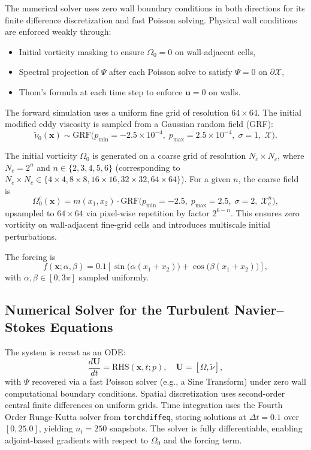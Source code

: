 The numerical solver uses zero wall boundary conditions in both directions for its finite difference discretization and fast Poisson solving. Physical wall conditions are enforced weakly through:
\begin{itemize}
    \item Initial vorticity masking to ensure \( \Omega_0 = 0 \) on wall-adjacent cells,
    \item Spectral projection of \( \Psi \) after each Poisson solve to satisfy \( \Psi = 0 \) on \( \partial \mathcal{X} \),
    \item Thom’s formula at each time step to enforce \( \mathbf{u} = 0 \) on walls.
\end{itemize}

The forward simulation uses a uniform fine grid of resolution \( 64 \times 64 \). The initial modified eddy viscosity is sampled from a Gaussian random field (GRF):
\[
\tilde{\nu}_0(\mathbf{x}) \sim \text{GRF}\bigl(p_{\min} = -2.5 \times 10^{-4},\; p_{\max} = 2.5 \times 10^{-4},\; \sigma = 1,\; \mathcal{X}\bigr).
\]

The initial vorticity \( \Omega_0 \) is generated on a coarse grid of resolution \( N_c \times N_c \), where \( N_c = 2^n \) and \( n \in \{2, 3, 4, 5, 6\} \) (corresponding to \( N_c \times N_c \in \{4\times4, 8\times8, 16\times16, 32\times32, 64\times64\} \)). For a given \( n \), the coarse field is
\[
\Omega_0^c(\mathbf{x}) = m(x_1, x_2) \cdot \text{GRF}\bigl(p_{\min} = -2.5,\; p_{\max} = 2.5,\; \sigma = 2,\; \mathcal{X}_c^n\bigr),
\]
upsampled to \( 64 \times 64 \) via pixel-wise repetition by factor \( 2^{6-n} \). This ensures zero vorticity on wall-adjacent fine-grid cells and introduces multiscale initial perturbations.

The forcing is
\[
f(\mathbf{x}; \alpha, \beta) = 0.1 \left[ \sin\!\bigl(\alpha (x_1 + x_2)\bigr) + \cos\!\bigl(\beta (x_1 + x_2)\bigr) \right],
\]
with \( \alpha, \beta \in [0, 3\pi] \) sampled uniformly.

\subsection*{Numerical Solver for the Turbulent Navier--Stokes Equations}

The system is recast as an ODE:
\[
\frac{d\mathbf{U}}{dt} = \text{RHS}(\mathbf{x}, t; p), \quad \mathbf{U} = [\Omega, \tilde{\nu}],
\]
with \( \Psi \) recovered via a fast Poisson solver (e.g., a Sine Transform) under zero wall computational boundary conditions. Spatial discretization uses second-order central finite differences on uniform grids. Time integration uses the Fourth Order Runge-Kutta solver from \texttt{torchdiffeq}, storing solutions at \( \Delta t = 0.1 \) over \( [0, 25.0] \), yielding \( n_t = 250 \) snapshots. The solver is fully differentiable, enabling adjoint-based gradients with respect to \( \Omega_0 \) and the forcing term.





